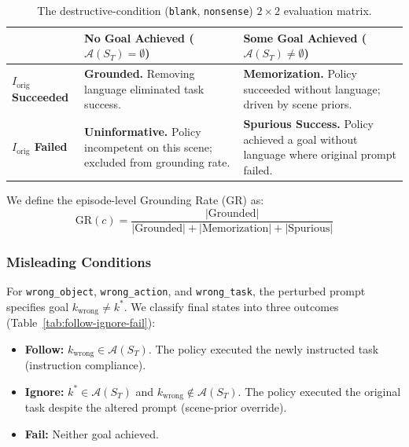 \documentclass[11pt]{article}
\begin{document}
\begin{table}[t]
    \centering
    \small
    \renewcommand{\arraystretch}{1.25}
    \begin{tabular}{@{}p{3.0cm}p{5.5cm}p{5.5cm}@{}}
        \hline
        & \textbf{No Goal Achieved ($\mathcal{A}(S_T) = \emptyset$)} & \textbf{Some Goal Achieved ($\mathcal{A}(S_T) \neq \emptyset$)} \\
        \hline
        \textbf{$I_{\text{orig}}$ Succeeded} & \textbf{Grounded.} Removing language eliminated task success. & \textbf{Memorization.} Policy succeeded without language; driven by scene priors. \\
        \textbf{$I_{\text{orig}}$ Failed} & \textbf{Uninformative.} Policy incompetent on this scene; excluded from grounding rate. & \textbf{Spurious Success.} Policy achieved a goal without language where original prompt failed. \\
        \hline
    \end{tabular}
    \caption{The destructive-condition (\texttt{blank}, \texttt{nonsense}) $2\times2$ evaluation matrix.}
    \label{tab:destructive-2x2}
\end{table}

We define the episode-level Grounding Rate ($\text{GR}$) as:
\begin{equation}
\text{GR}(c) = \frac{|\text{Grounded}|}{|\text{Grounded}| + |\text{Memorization}| + |\text{Spurious}|}
\end{equation}

\subsubsection{Misleading Conditions}
For \texttt{wrong\_object}, \texttt{wrong\_action}, and \texttt{wrong\_task}, the perturbed prompt specifies goal $k_{\text{wrong}} \neq k^*$. We classify final states into three outcomes (Table~\ref{tab:follow-ignore-fail}):
\begin{itemize}
    \item \textbf{Follow:} $k_{\text{wrong}} \in \mathcal{A}(S_T)$. The policy executed the newly instructed task (instruction compliance).
    \item \textbf{Ignore:} $k^* \in \mathcal{A}(S_T)$ and $k_{\text{wrong}} \notin \mathcal{A}(S_T)$. The policy executed the original task despite the altered prompt (scene-prior override).
    \item \textbf{Fail:} Neither goal achieved.
\end{itemize}
\end{document}
